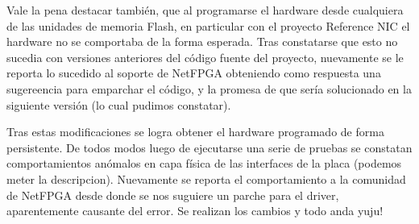 Vale la pena destacar tambi\'en, que al programarse el hardware desde cualquiera de las unidades de memoria Flash, en particular con el proyecto Reference NIC el hardware no se comportaba de la forma esperada. Tras constatarse que esto no sucedia con versiones anteriores del c\'odigo fuente del proyecto, nuevamente se le reporta lo sucedido al soporte de NetFPGA obteniendo como respuesta una sugereencia para emparchar el c\'odigo, y la promesa de que ser\'ia solucionado en la siguiente versi\'on (lo cual pudimos constatar).

Tras estas modificaciones se logra obtener el hardware programado de forma persistente. De todos modos luego de ejecutarse una serie de pruebas se constatan comportamientos an\'omalos en capa f\'isica de las interfaces de la placa (podemos meter la descripcion). Nuevamente se reporta el comportamiento a la comunidad de NetFPGA desde donde se nos suguiere un parche para el driver, aparentemente causante del error. Se realizan los cambios y todo anda yuju!  





